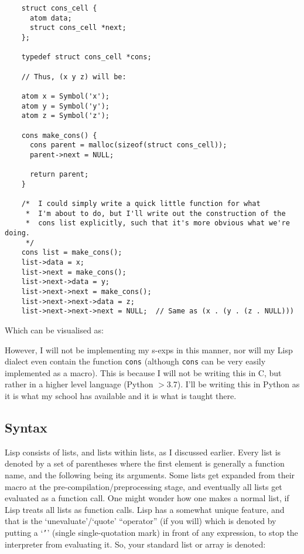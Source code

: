 \documentclass{article}
\newcommand{\code}[1]{\texttt{#1}}
\begin{document}
    \begin{verbatim}
    struct cons_cell {
      atom data;
      struct cons_cell *next;
    };

    typedef struct cons_cell *cons;

    // Thus, (x y z) will be:

    atom x = Symbol('x');
    atom y = Symbol('y');
    atom z = Symbol('z');

    cons make_cons() {
      cons parent = malloc(sizeof(struct cons_cell));
      parent->next = NULL;

      return parent;
    }

    /*  I could simply write a quick little function for what
     *  I'm about to do, but I'll write out the construction of the
     *  cons list explicitly, such that it's more obvious what we're doing.
     */
    cons list = make_cons();
    list->data = x;
    list->next = make_cons();
    list->next->data = y;
    list->next->next = make_cons();
    list->next->next->data = z;
    list->next->next->next = NULL;  // Same as (x . (y . (z . NULL)))
    \end{verbatim}

    Which can be visualised as:


    However, I will not be implementing my s-exps in this manner, nor
    will my Lisp dialect even contain the function \code{cons}
    (although \code{cons} can be very easily implemented as a macro).
    This is  because I will not be writing this in C, but rather in a higher
    level language (Python $>$3.7).  I'll be writing this in Python as it is
    what my school has available and it is what is taught there.

  \subsection{Syntax}
    Lisp consists of lists, and lists within lists,
    as I discussed earlier. Every list is denoted by a set of
    parentheses where the first element is generally a function name, and the
    following being its arguments. Some lists get expanded from their macro at
    the pre-compilation/preprocessing stage,
    and eventually all lists get evaluated as a
    function call. One might wonder how one makes a normal list, if Lisp treats
    all lists as function calls. Lisp has a somewhat unique feature, and that is
    the `unevaluate'/`quote' ``operator'' (if you will) which is denoted by
    putting
    a `\code{'}' (single single-quotation mark)
    in front of any expression, to stop the interpreter from evaluating it.
    So, your standard list or array is denoted:
\end{document}
